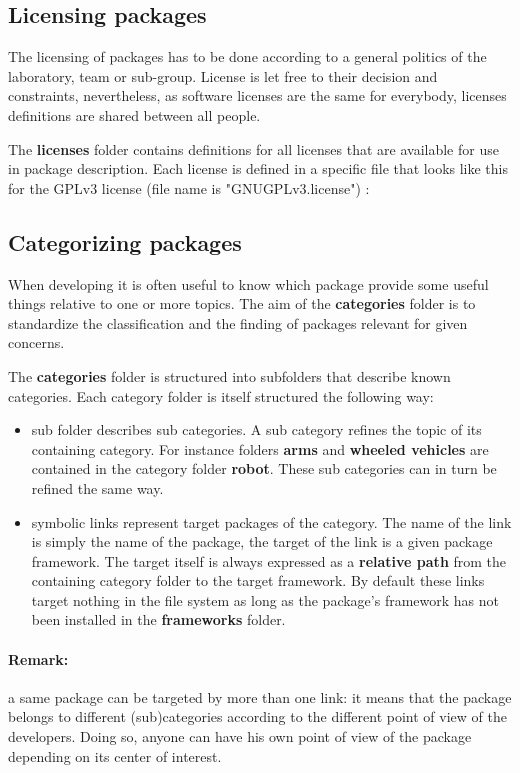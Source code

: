\documentclass[12pt,a4paper]{article}
\begin{document}
\subsection{Licensing packages}

The licensing of packages has to be done according to a general politics of the laboratory, team or sub-group. License is let free to their decision and constraints, nevertheless, as software licenses are the same for everybody, licenses definitions are shared between all people.

The \textbf{licenses} folder contains definitions for all licenses that are available for use in package description. Each license is defined in a specific file that looks like this for the GPLv3 license (file name is "GNUGPLv3.license") :


\subsection{Categorizing packages}

When developing it is often useful to know which package provide some useful things relative to one or more topics. The aim of the \textbf{categories} folder is to standardize the classification and the finding of packages relevant for given concerns.

The \textbf{categories} folder is structured into subfolders that describe known categories. Each category folder is itself structured the following way:
\begin{itemize}
\item sub folder describes sub categories. A sub category refines the topic of its containing category. For instance folders \textbf{arms} and \textbf{wheeled vehicles} are contained in the category folder \textbf{robot}. These sub categories can in turn be refined the same way.
\item symbolic links represent target packages of the category. The name of the link is simply the name of the package, the target of the link is a given package framework. The target itself is always expressed as a \textbf{relative path} from the containing category folder to the target framework. By default these links target nothing in the file system as long as the package's framework has not been installed in the \textbf{frameworks} folder.
\end{itemize}

\paragraph*{Remark:} 
a same package can be targeted by more than one link: it means that the package belongs to different (sub)categories according to the different point of view of the developers. Doing so, anyone can have his own point of view of the package depending on its center of interest.
\linebreak
\end{document}
